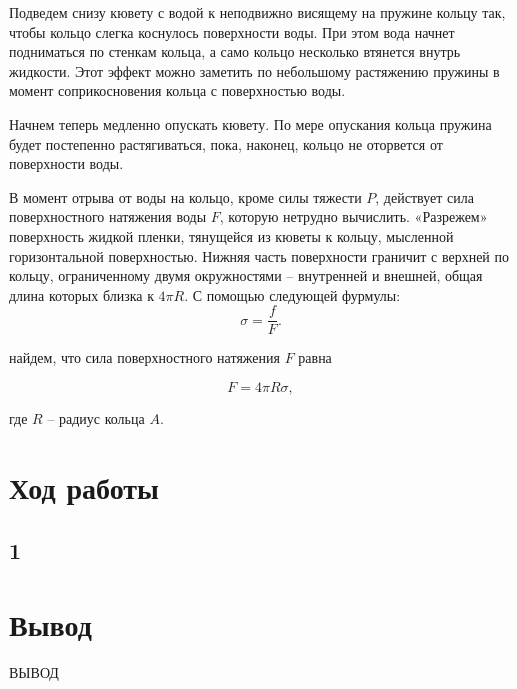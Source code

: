 \documentclass[a4paper,11.5pt]{article} %
\begin{document}
Подведем снизу кювету с водой к неподвижно висящему на пружине кольцу так, чтобы кольцо слегка коснулось поверхности воды. При этом вода начнет подниматься по стенкам кольца, а само кольцо несколько втянется внутрь жидкости. Этот эффект можно заметить по небольшому растяжению пружины в момент соприкосновения кольца с поверхностью воды.

Начнем теперь медленно опускать кювету. По мере опускания кольца пружина будет постепенно растягиваться, пока, наконец, кольцо не оторвется от поверхности воды.

В момент отрыва от воды на кольцо, кроме силы тяжести $P$, действует сила поверхностного натяжения воды $F$, которую нетрудно вычислить. «Разрежем» поверхность жидкой пленки, тянущейся из кюветы к кольцу, мысленной горизонтальной поверхностью. Нижняя часть поверхности граничит с верхней по кольцу, ограниченному двумя окружностями -- внутренней и внешней, общая длина которых близка к $4\pi R$. С помощью следующей фурмулы:
\begin{equation}
	\sigma = \frac{f}{F}.
	\label{eq:5.1}
\end{equation}
 
найдем, что сила поверхностного натяжения $F$ равна

\begin{equation}
	F = 4\pi R\sigma,
	\label{eq:1}
\end{equation}

где $R$ -- радиус кольца $A$.
 
\section{Ход работы}

\subsection{1}


\section{Вывод}
ВЫВОД

\begin{figure}[h]
\end{figure}


					
\end{document}
